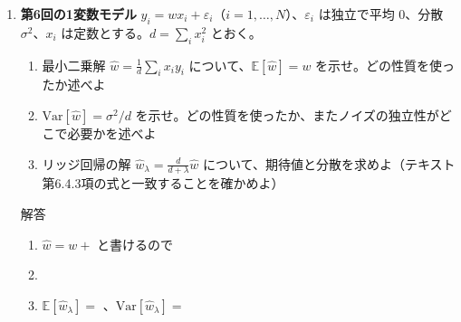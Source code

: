 \documentclass[a4paper,dvipdfmx]{jsarticle}
\newcommand{\提出期限}{2026年11月9日（月）}
\newcommand{\学籍番号}{0000000}
\newcommand{\氏名}{氏名を書く}
\newcommand{\提出日}{2026年11月9日}
\newenvironment{answer}{\begin{itembox}[l]{解答}}{\end{itembox}}
\begin{document}
\begin{enumerate}
  \item \textbf{第6回の1変数モデル}\quad
    $y_i = w x_i + \varepsilon_i$（$i = 1, \ldots, N$）、$\varepsilon_i$ は独立で平均 $0$、分散 $\sigma^2$、$x_i$ は定数とする。$d = \sum_i x_i^2$ とおく。
    \begin{enumerate}
      \item 最小二乗解 $\hat{w} = \frac{1}{d}\sum_i x_i y_i$ について、$\mathbb{E}[\hat{w}] = w$ を示せ。どの性質を使ったか述べよ
      \item $\mathrm{Var}[\hat{w}] = \sigma^2/d$ を示せ。どの性質を使ったか、またノイズの独立性がどこで必要かを述べよ
      \item リッジ回帰の解 $\hat{w}_\lambda = \frac{d}{d + \lambda}\hat{w}$ について、期待値と分散を求めよ（テキスト第6.4.3項の式と一致することを確かめよ）
    \end{enumerate}
    \begin{answer}
      \begin{enumerate}
        \item $\hat{w} = w + $ \phantom{XXXXXXXXXX} と書けるので
          \vspace{10mm}
        \item
          \vspace{14mm}
        \item $\mathbb{E}[\hat{w}_\lambda] = $ \phantom{XXXXXXXX}、$\mathrm{Var}[\hat{w}_\lambda] = $ \phantom{XXXXXXXX}
          \vspace{4mm}
      \end{enumerate}
    \end{answer}


\end{enumerate}
\end{document}
